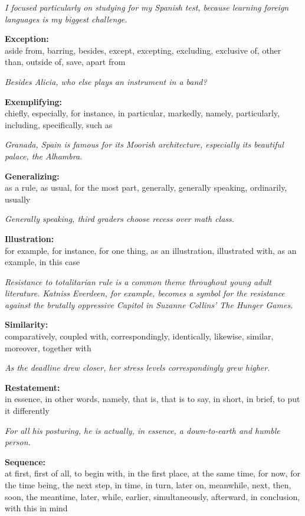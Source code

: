 \bigskip
\textit{I focused particularly on studying for my Spanish test, because learning foreign languages is my biggest challenge. }

\bigskip
\textbf{Exception:}\\
aside from, barring, besides, except, excepting, excluding, exclusive of, other than, outside of, save, apart from

\bigskip
\textit{Besides Alicia, who else plays an instrument in a band?}

\bigskip
\textbf{Exemplifying:}\\
chiefly, especially, for instance, in particular, markedly, namely, particularly, including, specifically, such as

\bigskip
\textit{Granada, Spain is famous for its Moorish architecture, especially its beautiful palace, the Alhambra.}

\bigskip
\textbf{Generalizing:}\\
as a rule, as usual, for the most part, generally, generally speaking, ordinarily, usually

\bigskip
\textit{Generally speaking, third graders choose recess over math class.}

\bigskip
\textbf{Illustration:}\\
for example, for instance, for one thing, as an illustration, illustrated with, as an example, in this case


\bigskip
\textit{Resistance to totalitarian rule is a common theme throughout young adult literature.  Katniss Everdeen, for example, becomes a symbol for the resistance against the brutally oppressive Capitol in Suzanne Collins' The Hunger Games.}

\bigskip
\textbf{Similarity:}\\
comparatively, coupled with, correspondingly, identically, likewise, similar, moreover, together with

\bigskip
\textit{As the deadline drew closer, her stress levels correspondingly grew higher.}

\bigskip
\textbf{Restatement:}\\
in essence, in other words, namely, that is, that is to say, in short, in brief, to put it differently

\bigskip
\textit{For all his posturing, he is actually, in essence, a down-to-earth and humble person.}

\bigskip
\textbf{Sequence:}\\
at first, first of all, to begin with, in the first place, at the same time, for now, for the time being, the next step, in time, in turn, later on, meanwhile, next, then, soon, the meantime, later, while, earlier, simultaneously, afterward, in conclusion, with this in mind

